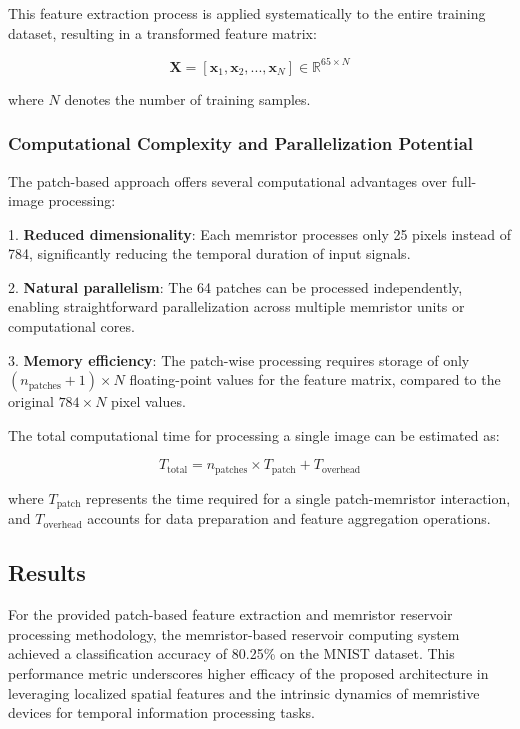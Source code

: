 \documentclass[11pt, oneside]{article}
\begin{document}
This feature extraction process is applied systematically to the entire training dataset, resulting in a transformed feature matrix:

\begin{equation}
    \mathbf{X} = [\mathbf{x}_1, \mathbf{x}_2, ..., \mathbf{x}_N] \in \mathbb{R}^{65 \times N}
\end{equation}

where \(N\) denotes the number of training samples.

\subsubsection{Computational Complexity and Parallelization Potential}

The patch-based approach offers several computational advantages over full-image processing:

1. \textbf{Reduced dimensionality}: Each memristor processes only 25 pixels instead of 784, significantly reducing the temporal duration of input signals.

2. \textbf{Natural parallelism}: The 64 patches can be processed independently, enabling straightforward parallelization across multiple memristor units or computational cores.

3. \textbf{Memory efficiency}: The patch-wise processing requires storage of only \((n_{\text{patches}} + 1) \times N\) floating-point values for the feature matrix, compared to the original \(784 \times N\) pixel values.

The total computational time for processing a single image can be estimated as:

\begin{equation}
    T_{\text{total}} = n_{\text{patches}} \times T_{\text{patch}} + T_{\text{overhead}}
\end{equation}

where \(T_{\text{patch}}\) represents the time required for a single patch-memristor interaction, and \(T_{\text{overhead}}\) accounts for data preparation and feature aggregation operations.


\subsection{Results}

For the provided patch-based feature extraction and memristor reservoir processing methodology, the memristor-based reservoir computing system achieved a classification accuracy of 80.25\% on the MNIST dataset. This performance metric underscores higher  efficacy of the proposed architecture in leveraging localized spatial features and the intrinsic dynamics of memristive devices for temporal information processing tasks.



\printbibliography
\end{document}
